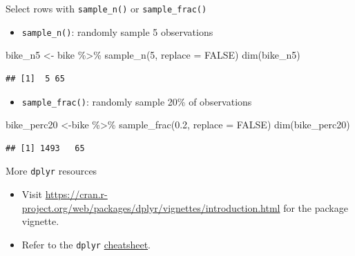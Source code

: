 \documentclass[
  ignorenonframetext,
]{beamer}
\newenvironment{Shaded}{\begin{snugshade}}{\end{snugshade}}
\newcommand{\AttributeTok}[1]{\textcolor[rgb]{0.77,0.63,0.00}{#1}}
\newcommand{\ConstantTok}[1]{\textcolor[rgb]{0.00,0.00,0.00}{#1}}
\newcommand{\DecValTok}[1]{\textcolor[rgb]{0.00,0.00,0.81}{#1}}
\newcommand{\FloatTok}[1]{\textcolor[rgb]{0.00,0.00,0.81}{#1}}
\newcommand{\FunctionTok}[1]{\textcolor[rgb]{0.00,0.00,0.00}{#1}}
\newcommand{\NormalTok}[1]{#1}
\newcommand{\OtherTok}[1]{\textcolor[rgb]{0.56,0.35,0.01}{#1}}
\newcommand{\SpecialCharTok}[1]{\textcolor[rgb]{0.00,0.00,0.00}{#1}}
\providecommand{\tightlist}{%
  \setlength{\itemsep}{0pt}\setlength{\parskip}{0pt}}
\begin{document}
\begin{frame}[fragile]{Select rows with \texttt{sample\_n()} or
\texttt{sample\_frac()}}
\protect\hypertarget{select-rows-with-sample_n-or-sample_frac}{}
\begin{itemize}
\tightlist
\item
  \texttt{sample\_n()}: randomly sample 5 observations
\end{itemize}

\begin{Shaded}
\begin{Highlighting}[]
\NormalTok{bike\_n5 }\OtherTok{\textless{}{-}}\NormalTok{ bike }\SpecialCharTok{\%\textgreater{}\%}
  \FunctionTok{sample\_n}\NormalTok{(}\DecValTok{5}\NormalTok{, }\AttributeTok{replace =} \ConstantTok{FALSE}\NormalTok{)}
\FunctionTok{dim}\NormalTok{(bike\_n5)}
\end{Highlighting}
\end{Shaded}

\begin{verbatim}
## [1]  5 65
\end{verbatim}

\begin{itemize}
\tightlist
\item
  \texttt{sample\_frac()}: randomly sample 20\% of observations
\end{itemize}

\begin{Shaded}
\begin{Highlighting}[]
\NormalTok{bike\_perc20 }\OtherTok{\textless{}{-}}\NormalTok{bike }\SpecialCharTok{\%\textgreater{}\%}
  \FunctionTok{sample\_frac}\NormalTok{(}\FloatTok{0.2}\NormalTok{, }\AttributeTok{replace =} \ConstantTok{FALSE}\NormalTok{)}
\FunctionTok{dim}\NormalTok{(bike\_perc20)}
\end{Highlighting}
\end{Shaded}

\begin{verbatim}
## [1] 1493   65
\end{verbatim}
\end{frame}

\begin{frame}[fragile]{More \texttt{dplyr} resources}
\protect\hypertarget{more-dplyr-resources}{}
\begin{itemize}
\item
  Visit
  \url{https://cran.r-project.org/web/packages/dplyr/vignettes/introduction.html}
  for the package vignette.
\item
  Refer to the \texttt{dplyr}
  \href{https://www.rstudio.com/wp-content/uploads/2015/02/data-wrangling-cheatsheet.pdf}{cheatsheet}.
\end{itemize}
\end{frame}
\end{document}
